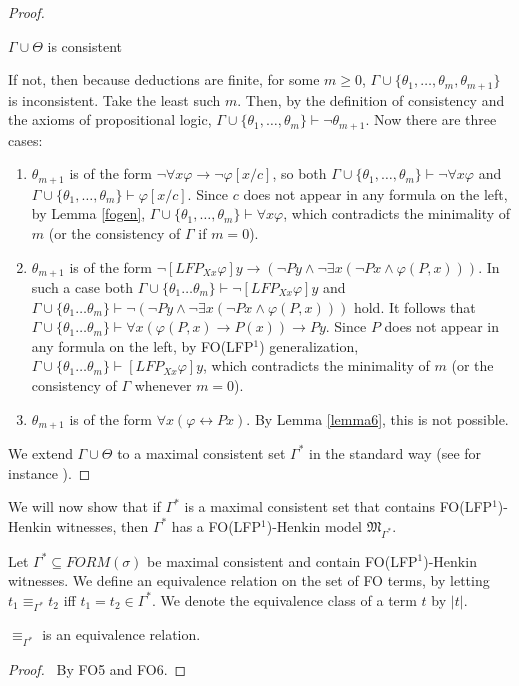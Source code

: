 \documentclass{LMCS}
\newcommand{\frM}{\mathfrak{M}}
\newcommand{\fo}{\textsf{FO}\xspace}
\newcommand{\folfp}{\textsf{FO(LFP$^1$)}\xspace}
\begin{document}
\begin{proof}
\begin{clm}
$\Gamma \cup \Theta$ is consistent
\end{clm}
If not, then because deductions are finite, for some $m \geq 0$,
$\Gamma \cup \{\theta_1, \ldots, \theta_m,\theta_{m+1}\}$ is
inconsistent. Take the least such $m$. Then, by the
definition of consistency and the axioms of propositional logic,
$\Gamma \cup \{\theta_1, \ldots, \theta_m\} \vdash
\neg\theta_{m+1}$. Now there are three cases:
\begin{enumerate}[(1)]
\item    $\theta_{m+1}$ is of the form $\neg \forall x \varphi \rightarrow
\neg \varphi[x/c]$, so both $\Gamma \cup
\{\theta_1,\ldots,\theta_m\} \vdash \neg \forall x \varphi$ and
$\Gamma \cup \{\theta_1,\ldots,\theta_m\} \vdash \varphi[x/c]$.
Since $c$ does not appear in any formula on the left, by Lemma
\ref{fogen}, $\Gamma \cup \{\theta_1,\ldots,\theta_m\} \vdash
\forall x \varphi$, which contradicts the minimality of $m$ (or
the consistency of $\Gamma$ if $m=0$).
\item   $\theta_{m+1}$ is of the form $\neg [LFP_{Xx}\varphi]y \rightarrow (\neg Py
\wedge \neg \exists x (\neg Px \wedge \varphi(P,x)))$. In such a
case both $\Gamma \cup \{\theta_1 \ldots \theta_m\} \vdash \neg
[LFP_{Xx}\varphi]y$ and $\Gamma \cup \{\theta_1 \ldots \theta_m\}
\vdash \neg(\neg Py \wedge \neg \exists x (\neg Px \wedge
\varphi(P,x)))$ hold. It follows that  $\Gamma \cup \{\theta_1 \ldots \theta_m\}
\vdash \forall x (\varphi(P,x) \rightarrow P(x)) \rightarrow Py$. Since $P$ does not appear in any formula on
the left, by \folfp generalization, $\Gamma \cup \{\theta_1 \ldots
\theta_m\} \vdash [LFP_{Xx}\varphi]y$, which contradicts the
minimality of $m$ (or the consistency of $\Gamma$ whenever $m=0$).
\item   $\theta_{m+1}$ is of the form $\forall x (\varphi \leftrightarrow Px)$.
By Lemma \ref{lemma6}, this is not possible.
\end{enumerate}
We extend $\Gamma \cup \Theta$ to a maximal consistent set
$\Gamma^*$ in the standard way (see for instance \cite[page 137]{Enderton}).
\end{proof}


We will now show that if $\Gamma^*$ is a maximal consistent set that
contains \folfp-Henkin witnesses, then $\Gamma^*$ has a \folfp-Henkin
model $\frM_{\Gamma^*}$.

\begin{defi}
Let $\Gamma^* \subseteq FORM(\sigma)$ be maximal consistent and
contain \folfp-Henkin witnesses. We define an equivalence relation on the
set of \fo terms, by letting $t_1\equiv_{\Gamma^*}t_2$ iff
$t_1=t_2 \in \Gamma^*$. We denote the equivalence class of a term
$t$ by $|t|$.
\end{defi}
\begin{prop}
 $\equiv_{\Gamma^*}$ is an equivalence relation.
\end{prop}
\begin{proof}\
By  FO5 and FO6.
\end{proof}
\end{document}
